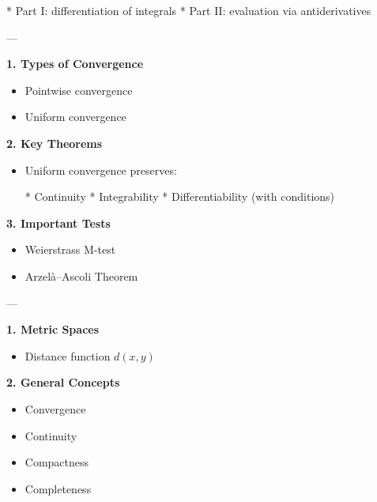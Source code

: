 \documentclass[12pt,a4paper]{report}
\begin{document}
\begin{description}
\begin{description}
  * Part I: differentiation of integrals
  * Part II: evaluation via antiderivatives

	\end{description}
---

\item {}

	\begin{description}
    \item \textbf{1. Types of Convergence}

		\begin{itemize}
        \item Pointwise convergence
        \item Uniform convergence
		\end{itemize}

    \item \textbf{2. Key Theorems}

		\begin{itemize}
        \item Uniform convergence preserves:

  * Continuity
  * Integrability
  * Differentiability (with conditions)
		\end{itemize}

    \item \textbf{3. Important Tests}

		\begin{itemize}
        \item Weierstrass M-test
        \item Arzelà–Ascoli Theorem
		\end{itemize}

	\end{description}
---

\item {}

	\begin{description}
    \item \textbf{1. Metric Spaces}

		\begin{itemize}
        \item Distance function $d(x,y)$
		\end{itemize}

    \item \textbf{2. General Concepts}

		\begin{itemize}
        \item Convergence
        \item Continuity
        \item Compactness
        \item Completeness
		\end{itemize}


\end{description}
\end{description}
\end{document}
